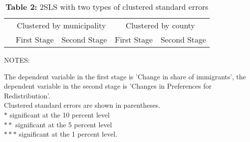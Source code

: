 \documentclass[12pt,a4paper]{standalone}
\newcommand\tab[1][1cm]{\hspace*{#1}}
\newcommand\tabs[1][0.8cm]{\hspace*{#1}}
\newcommand\tabu[1][0.4cm]{\hspace*{#1}}
\begin{document}
\begin{minipage}[c][24cm]{1.3 \textwidth}

\thispagestyle{empty}

\begin{table}
\centering
\caption*{\textbf{Table 2:} 2SLS with two types of clustered standard errors}

\begin{threeparttable}
\begin{tabular}{lllll}

    \toprule
    & \multicolumn{2}{c}{Clustered by municipality} & 			\multicolumn{2}{c}{Clustered by county}\\
    \cmidrule(lr){2-3}
    \cmidrule(lr){4-5}
    & First Stage & Second Stage & 	First Stage & Second 		Stage \\ 
    \midrule
 

    \bottomrule
\end{tabular}

    \begin{tablenotes}
    \item NOTES:
	\par
	\begingroup
	\leftskip=0.3cm %
	\noindent 
	The dependent variable in the first stage is 				'Change in share of immigrants', the dependent 				variable in the second stage is 'Changes in 				Preferences for Redistribution'. \\
    Clustered standard errors are shown in parentheses. \\
    $ \ast $ \tab significant at the 10 percent level \\
    $ \ast \ast $ \tabs significant at the 5 percent level 	\\
    $ \ast \ast \ast $ \tabu significant at the 1 percent 		level.
	\par
	\endgroup




    \end{tablenotes}
\end{threeparttable}
\end{table}

\end{minipage}
\end{document}
